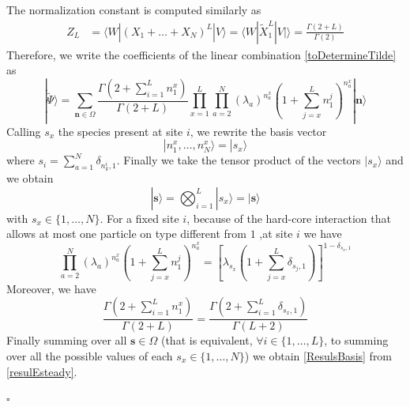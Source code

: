 \documentclass[11pt]{article}
\numberwithin{equation}{section}
\numberwithin{equation}{subsection}
\begin{document}
The normalization constant is computed similarly as 
\begin{align*}
	Z_{L}&=\langle W|(X_{1}+\ldots+X_{N})^{L}|V\rangle=\langle W|\widetilde{X}_{1}^{L}|V|\rangle=
	\frac{\Gamma(2+L)}{\Gamma(2)}
\end{align*}
Therefore, we write the coefficients of the linear combination \eqref{toDetermineTilde} as 
\begin{equation}\label{resulEsteady}
	|\widetilde{\Psi}\rangle= \sum_{\mathbf{n}\in \Omega}\frac{\Gamma(2+\sum_{i=1}^{L}n_{1}^{x})}{\Gamma(2+L)}\prod_{x=1}^{L}\prod_{a=2}^{N}\left(\lambda_{a}\right)^{n_{a}^{x}}\left(1+\sum_{j=x}^{L}n_{1}^{j}\right)^{n_{a}^{x}}|\mathbf{n}\rangle
\end{equation}
Calling $s_{x}$ the species present at site $i$, we rewrite the basis vector 
\begin{equation}
	|n_{1}^{x},\ldots,n_{N}^{x}\rangle=|s_{x}\rangle
\end{equation}
where $s_i=\sum_{a=1}^N\delta_{n_k^i,1}$. Finally we take the tensor product of the vectors $|s_{x}\rangle$ and we obtain
\begin{equation}
	|\mathbf{s}\rangle=\bigotimes_{i=1}^{L}|s_{x}\rangle=|\mathbf{s}\rangle
\end{equation}
with $s_{x}\in\{1,\ldots,N\}$. For a fixed site $i$, because of the hard-core interaction that allows at most one particle on type different from $1$ ,at site $i$ we have 
\begin{equation}
	\prod_{a=2}^{N}\left(\lambda_{a}\right)^{n_{a}^{x}}\left(1+\sum_{j=x}^{L}n_{1}^{j}\right)^{n_{a}^{x}}=\left[\lambda_{s_{x}}\left(1+\sum_{j=x}^{L}\delta_{s_{j},1}\right)\right]^{1-\delta_{s_{x},1}}
\end{equation}
Moreover, we have 
\begin{equation}
	\frac{\Gamma(2+\sum_{i=1}^{L}n_{1}^{x})}{\Gamma(2+L)}=\frac{\Gamma\left(2+\sum_{i=1}^{L}\delta_{s_{x},1}\right)}{\Gamma\left(L+2\right)}
\end{equation}
Finally summing over all $\mathbf{s}\in \Omega$ (that is equivalent, $\forall i\in\{1,\ldots,L\}$, to summing over all the possible values of each $s_{x}\in\{1,\ldots,N\}$) we obtain \eqref{ResulsBasis} from \eqref{resulEsteady}.
\begin{flushright}
$\square$
\end{flushright}
\end{document}
